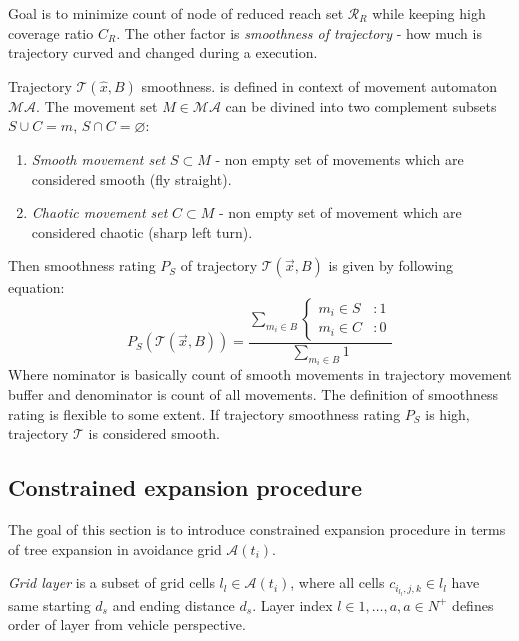 \noindent Goal is to minimize count of node of reduced reach set $\mathscr{R}_R$ while keeping high coverage ratio $C_R$. The other factor is \emph{smoothness of trajectory} - how much is trajectory curved and changed during a execution. 
\begin{definition}{Trajectory $\mathscr{T}(\hat{x},B)$ smoothness}\label{def:TrajectorySmoothnes}. is defined in context of movement automaton $\mathscr{MA}$. The movement set $M\in \mathscr{MA}$ can be divined into two complement subsets $S\cup C = m$, $S\cap C = \varnothing$:
\begin{enumerate}
    \item \emph{Smooth movement set} $S\subset M$ - non empty set of movements which are considered smooth (fly straight).
    \item \emph{Chaotic movement set} $C \subset M$ - non empty set of movement which are considered chaotic (sharp left turn).
\end{enumerate}
Then smoothness rating $P_S$ of trajectory $\mathscr{T}(\vec{x},B)$ is given by following equation:
\begin{equation}\label{eq:smmothnesFunction}
    P_S(\mathscr{T}(\vec{x},B))=\frac{\sum_{m_i\in B} \begin{cases}m_i\in S&:1\\m_i\in C&:0\end{cases}}{\sum_{m_i \in B} 1}
\end{equation}
\noindent Where nominator is basically count of smooth movements in trajectory movement buffer and denominator is count of all movements. The definition of smoothness rating is flexible to some extent. 
If trajectory smoothness rating $P_S$ is high, trajectory $\mathscr{T}$ is considered smooth.
\end{definition}

\newpage\subsection{Constrained expansion procedure}\label{susbsec:ConstrainedExpansionProcedure}
\noindent The goal of this section is to introduce constrained expansion procedure in terms of tree expansion in avoidance grid $\mathscr{A}(t_i)$.

\emph{Grid layer} is a subset of grid cells $l_l\in\mathscr{A}(t_i)$, where all cells $c_{i_{l_l},j,k}\in l_l$ have same starting $d_s$ and ending distance $d_s$. Layer index $l\in {1,\dots,a},a\in N^+$ defines order of layer from vehicle perspective.

